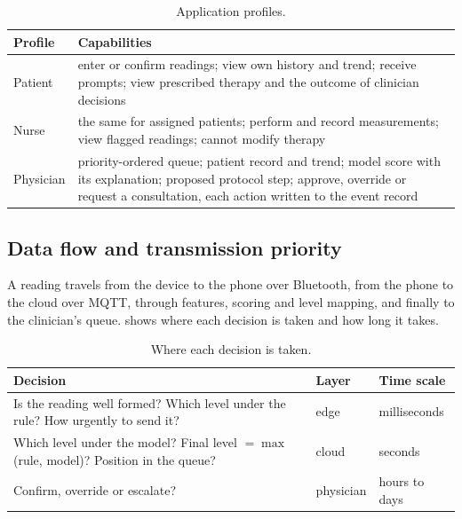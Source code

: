 \begin{table}[htbp]
\centering\small
\caption{Application profiles.}\label{tab:profiles}
\begin{tabularx}{\textwidth}{@{}>{\raggedright\arraybackslash}p{2.1cm} X@{}}
\toprule
\textbf{Profile} & \textbf{Capabilities} \\
\midrule
Patient & enter or confirm readings; view own history and trend; receive prompts; view prescribed therapy and the outcome of clinician decisions \\
Nurse & the same for assigned patients; perform and record measurements; view flagged readings; cannot modify therapy \\
Physician & priority-ordered queue; patient record and trend; model score with its explanation; proposed protocol step; approve, override or request a consultation, each action written to the event record \\
\bottomrule
\end{tabularx}
\end{table}

\subsection{Data flow and transmission priority}\label{sec:dataflow}\label{sec:transmission-priority}

A reading travels from the device to the phone over Bluetooth, from the phone to the cloud over MQTT, through features, scoring and level mapping, and finally to the clinician's queue.  shows where each decision is taken and how long it takes.

\begin{table}[htbp]
\centering\small
\caption{Where each decision is taken.}\label{tab:decision-placement}
\begin{tabularx}{\textwidth}{@{}X >{\raggedright\arraybackslash}p{3.0cm} >{\raggedright\arraybackslash}p{2.6cm}@{}}
\toprule
\textbf{Decision} & \textbf{Layer} & \textbf{Time scale} \\
\midrule
Is the reading well formed? Which level under the rule? How urgently to send it? & edge & milliseconds \\
Which level under the model? Final level $=\max$(rule, model)? Position in the queue? & cloud & seconds \\
Confirm, override or escalate? & physician & hours to days \\
\bottomrule
\end{tabularx}
\end{table}

